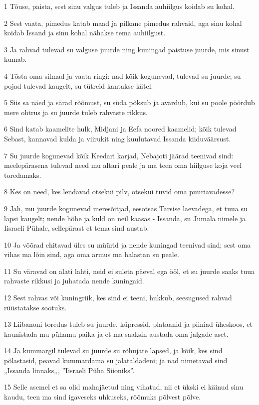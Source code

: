 \par 1 Tõuse, paista, sest sinu valgus tuleb ja Issanda auhiilgus koidab su kohal.
\par 2 Sest vaata, pimedus katab maad ja pilkane pimedus rahvaid, aga sinu kohal koidab Issand ja sinu kohal nähakse tema auhiilgust.
\par 3 Ja rahvad tulevad su valguse juurde ning kuningad paistuse juurde, mis sinust kumab.
\par 4 Tõsta oma silmad ja vaata ringi: nad kõik kogunevad, tulevad su juurde; su pojad tulevad kaugelt, su tütreid kantakse kätel.
\par 5 Siis sa näed ja särad rõõmust, su süda põksub ja avardub, kui su poole pöördub mere ohtrus ja su juurde tuleb rahvaste rikkus.
\par 6 Sind katab kaamelite hulk, Midjani ja Eefa noored kaamelid; kõik tulevad Sebast, kannavad kulda ja viirukit ning kuulutavad Issanda kiiduväärsust.
\par 7 Su juurde kogunevad kõik Keedari karjad, Nebajoti jäärad teenivad sind: meelepärasena tulevad need mu altari peale ja ma teen oma hiilguse koja veel toredamaks.
\par 8 Kes on need, kes lendavad otsekui pilv, otsekui tuvid oma puuriavadesse?
\par 9 Jah, mu juurde kogunevad meresõitjad, eesotsas Tarsise laevadega, et tuua su lapsi kaugelt; nende hõbe ja kuld on neil kaasas - Issanda, su Jumala nimele ja Iisraeli Pühale, sellepärast et tema sind austab.
\par 10 Ja võõrad ehitavad üles su müürid ja nende kuningad teenivad sind; sest oma vihas ma lõin sind, aga oma armus ma halastan su peale.
\par 11 Su väravad on alati lahti, neid ei suleta päeval ega ööl, et su juurde saaks tuua rahvaste rikkusi ja juhatada nende kuningaid.
\par 12 Sest rahvas või kuningriik, kes sind ei teeni, hukkub, seesugused rahvad rüüstatakse sootuks.
\par 13 Liibanoni toredus tuleb su juurde, küpressid, plataanid ja piiniad üheskoos, et kaunistada mu pühamu paika ja et ma saaksin austada oma jalgade aset.
\par 14 Ja kummargil tulevad su juurde su rõhujate lapsed, ja kõik, kes sind põlastasid, peavad kummardama su jalataldadeni; ja nad nimetavad sind „Issanda linnaks„, ”Iisraeli Püha Siioniks”.
\par 15 Selle asemel et sa olid mahajäetud ning vihatud, nii et ükski ei käinud sinu kaudu, teen ma sind igaveseks uhkuseks, rõõmuks põlvest põlve.
